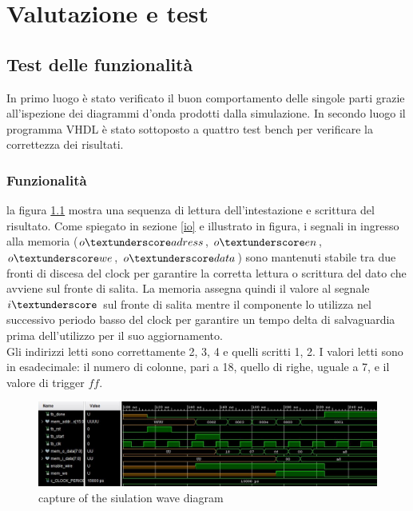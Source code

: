 \chapter{Valutazione e test}

\section{Test delle funzionalità}

In primo luogo è stato verificato il buon comportamento delle singole parti grazie all'ispezione dei diagrammi d'onda prodotti dalla simulazione. In secondo luogo il programma VHDL è stato sottoposto a quattro test bench per verificare la correttezza dei risultati.

\subsection{Funzionalità}
la figura \ref{fig:io} mostra una sequenza di lettura dell'intestazione e scrittura del risultato. Come spiegato in sezione \ref{io} e illustrato in figura, i segnali in ingresso alla memoria ($o \textunderscore adress$, $o \textunderscore en$, $o \textunderscore we$, $o \textunderscore data$) sono mantenuti stabile tra due fronti di discesa del clock per garantire la corretta lettura o scrittura del dato che avviene sul fronte di salita. La memoria assegna quindi il valore al segnale $i \textunderscore $ sul fronte di salita mentre il componente lo utilizza nel successivo periodo basso del clock per garantire un tempo delta di salvaguardia prima dell'utilizzo per il suo aggiornamento.\\

Gli indirizzi letti sono correttamente 2, 3, 4 e quelli scritti 1, 2. I valori letti sono in esadecimale: il numero di colonne, pari a 18, quello di righe, uguale a 7, e il valore di trigger $ff$.

\begin{figure}
	\includegraphics[scale=0.5]{evaluation/IO.JPG}
    \caption{capture of the siulation wave diagram }
    \label{fig:io}
\end{figure}

